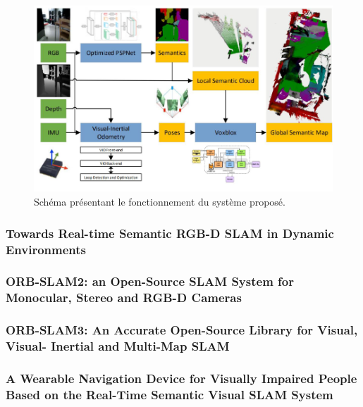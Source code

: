 \documentclass[11pt]{article}
\begin{document}
  \begin{figure}[hbt]  
    \includegraphics[width=\textwidth]{PipelineP2.png}    
    \caption{Schéma présentant le fonctionnement du système proposé.}
    \label{fig:PipelineP2}
  \end{figure} 

  


  \pagebreak
 
  \subsubsection{Towards Real-time Semantic RGB-D SLAM in Dynamic Environments}

  \pagebreak

  \subsubsection{ORB-SLAM2: an Open-Source SLAM System for Monocular, Stereo and
  RGB-D Cameras}  

  \pagebreak

  \subsubsection{ORB-SLAM3: An Accurate Open-Source Library for Visual, Visual-
  Inertial and Multi-Map SLAM}

  \pagebreak

  \subsubsection{A Wearable Navigation Device for Visually Impaired People Based on
  the Real-Time Semantic Visual SLAM System}

  \pagebreak
\end{document}
